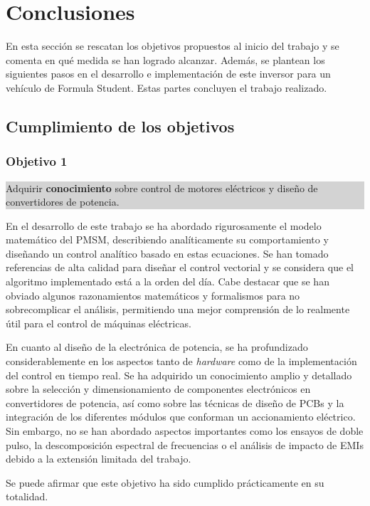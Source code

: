 \newpage
\section{Conclusiones}

En esta sección se rescatan los objetivos propuestos al inicio del trabajo y se comenta en qué medida se han logrado alcanzar. Además, se plantean los siguientes pasos en el desarrollo e implementación de este inversor para un vehículo de Formula Student. Estas partes concluyen el trabajo realizado.

\subsection{Cumplimiento de los objetivos}

\subsubsection*{Objetivo 1}
\colorbox{lightgray}{%
	\parbox{\dimexpr\linewidth-2\fboxsep-2\fboxrule}{%
		Adquirir \textbf{conocimiento} sobre control de motores eléctricos y diseño de convertidores de potencia.%
	}%
}

En el desarrollo de este trabajo se ha abordado rigurosamente el modelo matemático del PMSM, describiendo analíticamente su comportamiento y diseñando un control analítico basado en estas ecuaciones. Se han tomado referencias de alta calidad para diseñar el control vectorial y se considera que el algoritmo implementado está a la orden del día. Cabe destacar que se han obviado algunos razonamientos matemáticos y formalismos para no sobrecomplicar el análisis, permitiendo una mejor comprensión de lo realmente útil para el control de máquinas eléctricas.

En cuanto al diseño de la electrónica de potencia, se ha profundizado considerablemente en los aspectos tanto de \textit{hardware} como de la implementación del control en tiempo real. Se ha adquirido un conocimiento amplio y detallado sobre la selección y dimensionamiento de componentes electrónicos en convertidores de potencia, así como sobre las técnicas de diseño de PCBs y la integración de los diferentes módulos que conforman un accionamiento eléctrico. Sin embargo, no se han abordado aspectos importantes como los ensayos de doble pulso, la descomposición espectral de frecuencias o el análisis de impacto de EMIs debido a la extensión limitada del trabajo.

Se puede afirmar que este objetivo ha sido cumplido prácticamente en su totalidad.


